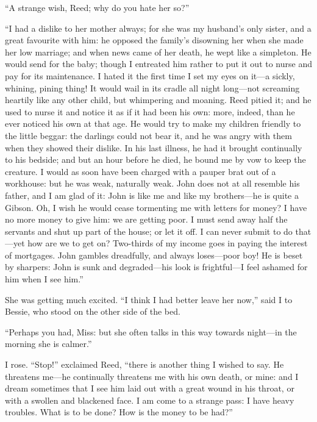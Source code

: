 \enquote{A strange wish, \Mrs{} Reed; why do you hate her so?}

\enquote{I had a dislike to her mother always; for she was my husband's
	only sister, and a great favourite with him: he opposed the family's
	disowning her when she made her low marriage; and when news came of her
	death, he wept like a simpleton. He would send for the baby; though I
	entreated him rather to put it out to nurse and pay for its
	maintenance. I hated it the first time I set my eyes on it---a sickly,
	whining, pining thing! It would wail in its cradle all night long---not
	screaming heartily like any other child, but whimpering and moaning.
	Reed pitied it; and he used to nurse it and notice it as if it had been
	his own: more, indeed, than he ever noticed his own at that age. He
	would try to make my children friendly to the little beggar: the
	darlings could not bear it, and he was angry with them when they showed
	their dislike. In his last illness, he had it brought continually to
	his bedside; and but an hour before he died, he bound me by vow to keep
	the creature. I would as soon have been charged with a pauper brat out
	of a workhouse: but he was weak, naturally weak. John does not at all
	resemble his father, and I am glad of it: John is like me and like my
	brothers---he is quite a Gibson. Oh, I wish he would cease tormenting
	me with letters for money? I have no more money to give him: we are
	getting poor. I must send away half the servants and shut up part of
	the house; or let it off. I can never submit to do that---yet how are
	we to get on? Two-thirds of my income goes in paying the interest of
	mortgages. John gambles dreadfully, and always loses---poor boy! He is
	beset by sharpers: John is sunk and degraded---his look is frightful---I
	feel ashamed for him when I see him.}

She was getting much excited. \enquote{I think I had better leave her
	now,} said I to Bessie, who stood on the other side of the bed.

\enquote{Perhaps you had, Miss: but she often talks in this way towards
	night---in the morning she is calmer.}

I rose. \enquote{Stop!} exclaimed \Mrs{} Reed, \enquote{there is another
	thing I wished to say. He threatens me---he continually threatens me
	with his own death, or mine: and I dream sometimes that I see him laid
	out with a great wound in his throat, or with a swollen and blackened
	face. I am come to a strange pass: I have heavy troubles. What is to
	be done? How is the money to be had?}

